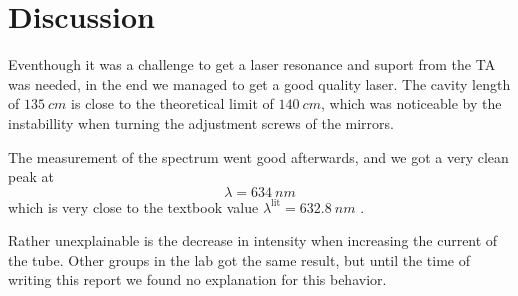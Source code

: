 \section{Discussion}
\label{sec:discussion}
Eventhough it was a challenge to get a laser resonance and suport from the TA was needed, in the end
we managed to get a good quality laser. The cavity length of $\SI{135}{cm}$ is close to the
theoretical limit of $\SI{140}{cm}$, which was noticeable by the instabillity when turning the
adjustment screws of the mirrors.

The measurement of the spectrum went good afterwards, and we got a very clean peak at
\[
  \lambda = \SI{634}{nm}
\]
which is very close to the textbook value $\lambda^\text{lit} = \SI{632.8}{nm}$
\cite{ABRAMCZYK200559}.

Rather unexplainable is the decrease in intensity when increasing the current of the tube. Other
groups in the lab got the same result, but until the time of writing this report we found no
explanation for this behavior.

